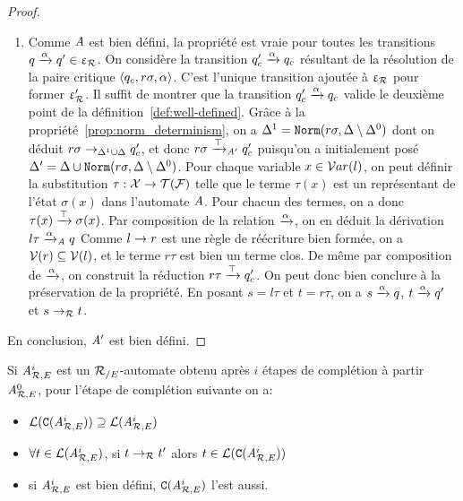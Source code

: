 \begin{proof}
\begin{enumerate}
\item \label{two}
  Comme $\mathit A$ est bien défini, la propriété est vraie pour toutes les transitions $q \xrightarrow{\alpha} q'\in \upvarepsilon_{\mathcal R}$.
  On considère la transition $q'_c \xrightarrow{\alpha} q_c$ résultant de la résolution de la paire critique $\langle q_c ,r\sigma,\alpha\rangle$. 
  C'est l'unique transition ajoutée à $\upvarepsilon_{\mathcal R}$ pour former $\upvarepsilon_{\mathcal R}'$. Il suffit de montrer que la transition $q'_c \xrightarrow{\alpha} q_c$
  valide le deuxième point de la définition~\ref{def:well-defined}.
  Grâce à la propriété~\ref{prop:norm_determinism}, on a $\Delta^1 = \mathtt{Norm}(r\sigma,\Delta\setminus\Delta^0)$ dont on
  déduit $r\sigma \rightarrow_{\Delta^1\cup\Delta} q'_c$, et donc $r\sigma \xrightarrow{\top}_{\mathit A'} q'_c$ puisqu'on a initialement posé 
  $\Delta' = \Delta \cup \mathtt{Norm}(r\sigma,\Delta\setminus\Delta^0)$.
  Pour chaque variable $x\in\mathcal{ V}ar(l)$, on peut définir la substitution $\tau:\mathcal X \rightarrow \mathcal{T(F)}$ 
  telle que le terme $\tau(x)$ est un représentant de l'état $\sigma(x)$ dans l'automate $\mathit A$.
  Pour chacun des termes, on a donc $\tau(x) \xrightarrow{\top} \sigma(x)$.
  Par composition de la relation $\xrightarrow{\alpha}$, on en déduit la dérivation $l\tau\xrightarrow{\alpha}_\mathit A q$
  Comme $l\rightarrow r$ est une règle de réécriture bien formée, on a $\mathcal V(r) \subseteq \mathcal V(l)$,
  et le terme $r\tau$ est bien un terme clos. De même par composition de $\xrightarrow{\alpha}$, 
  on construit la réduction $r\tau \xrightarrow{\top} q'_c$. On peut donc bien conclure à la préservation de la propriété.
  En posant $s=l\tau$ et $t=r\tau$, on a $s\xrightarrow{\alpha}q $, $t\xrightarrow{\alpha}q' $ et $s\rightarrow_\mathcal R t $.
\end{enumerate}
En conclusion, $\mathit A'$ est bien défini.
\end{proof}

\begin{theorem}
  \label{thm:C}
  Si ${\mathit A}_{\mathcal R,E}^i$ est un ${\mathcal R_{/E}}$-automate obtenu après $i$ étapes de complétion à partir ${\mathit A}_{\mathcal R,E}^0$,
  pour l'étape de complétion suivante on a:
  \begin{itemize}
  \item $\mathcal{L}(\mathtt{C}({\mathit A}_{\mathcal R,E}^i)) \supseteq \mathcal{L}({\mathit A}_{\mathcal R,E}^i)$
  \item $\forall t \in \mathcal{L}({\mathit A}_{\mathcal R,E}^i)$, si $t \rightarrow_\mathcal R t'$ alors $t \in \mathcal{L}(\mathtt{C}({\mathit A}_{\mathcal R,E}^i))$
  \item si ${\mathit A}_{\mathcal R,E}^i$ est bien défini, $\mathtt{C}({\mathit A}_{\mathcal R,E}^i)$ l'est aussi.
  \end{itemize}
\end{theorem}

